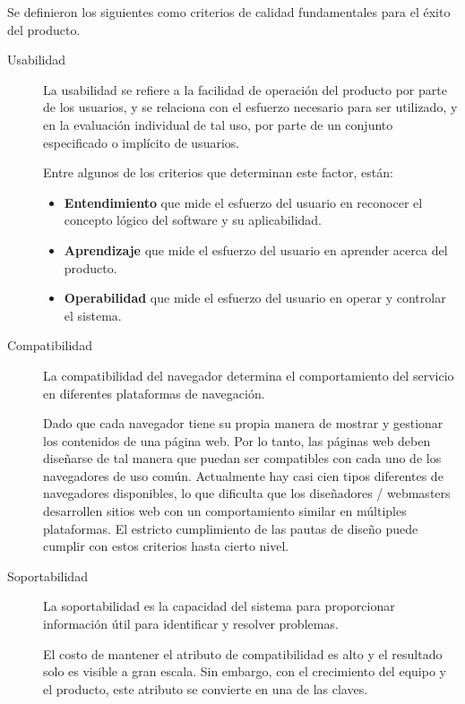 Se definieron los siguientes como criterios de calidad fundamentales para el
éxito del producto\cite{Fillottrani}.

\begin{description}
\item [Usabilidad] La usabilidad se refiere a la facilidad de operación del
    producto por parte de los usuarios, y se relaciona con el esfuerzo
    necesario para ser utilizado, y en la evaluación individual de tal uso, por
    parte de un conjunto especificado o implícito de usuarios.

    Entre algunos de los criterios que determinan este factor, están:

    \begin{itemize}
    \item \textbf{Entendimiento} que mide el esfuerzo del usuario en reconocer el
        concepto lógico del software y su aplicabilidad.
    \item \textbf{Aprendizaje} que mide el esfuerzo del usuario en aprender
        acerca del producto.
    \item \textbf{Operabilidad} que mide el esfuerzo del usuario en operar y
        controlar el sistema.
    \end{itemize}

\item [Compatibilidad] La compatibilidad del navegador determina el
    comportamiento del servicio en diferentes plataformas de navegación.

    Dado que cada navegador tiene su propia manera de mostrar y gestionar los
    contenidos de una página web. Por lo tanto, las páginas web deben diseñarse
    de tal manera que puedan ser compatibles con cada uno de los navegadores de
    uso común. Actualmente hay casi cien tipos diferentes de navegadores
    disponibles, lo que dificulta que los diseñadores / webmasters desarrollen
    sitios web con un comportamiento similar en múltiples plataformas. El
    estricto cumplimiento de las pautas de diseño puede cumplir con estos
    criterios hasta cierto nivel.

\item [Soportabilidad] La soportabilidad es la capacidad del sistema para
    proporcionar información útil para identificar y resolver problemas.

    El costo de mantener el atributo de compatibilidad es alto y el resultado
    solo es visible a gran escala. Sin embargo, con el crecimiento del equipo y
    el producto, este atributo se convierte en una de las claves\cite{Ashanin}.


\end{description}
